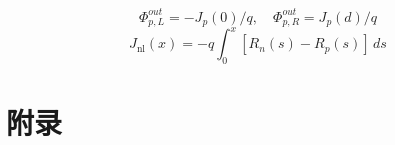 \begin{equation}
\Phi_{p,L}^{out}=-J_p(0)/q,\quad\Phi_{p,R}^{out}=J_p(d)/q
\label{eq:61}\end{equation}
\begin{equation}
J_{\mathrm{nl}}(x)=-q\int_0^x[R_n(s)-R_p(s)]\,ds
\label{eq:62}\end{equation}
\medskip
\begingroup\fontsize{10.6}{15.5}\selectfont\setlength{\parskip}{6pt plus 1pt}
\clearpage
\part*{{\cjkfont 附录}\allowbreak{} \allowbreak{}}
\FloatBarrier
\Needspace{110pt}
